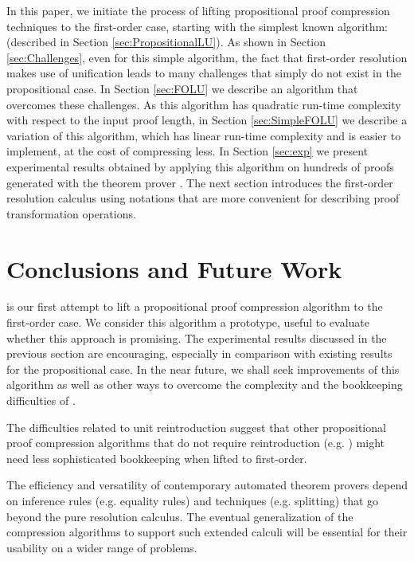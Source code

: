 \documentclass{llncs}
\begin{document}
In this paper, we initiate the process of lifting propositional proof compression techniques to the first-order case, starting with the simplest known algorithm: {\LowerUnits} (described in Section \ref{sec:PropositionalLU}). As shown in Section \ref{sec:Challenges}, even for this simple algorithm, the fact that first-order resolution makes use of unification leads to many challenges that simply do not exist in the propositional case. In Section \ref{sec:FOLU} we describe an algorithm that overcomes these challenges. As this algorithm has quadratic run-time complexity with respect to the input proof length, in Section \ref{sec:SimpleFOLU} we describe a variation of this algorithm, which has linear run-time complexity and is easier to implement, at the cost of compressing less. In Section \ref{sec:exp} we present experimental results obtained by applying this algorithm on hundreds of proofs generated with the {\SPASS} theorem prover \cite{SPASS}. The next section introduces the first-order resolution calculus using notations that are more convenient for describing proof transformation operations.















\section{Conclusions and Future Work}

{\SFOLowerUnits} is our first attempt to lift a propositional proof compression algorithm to the first-order case. We consider this algorithm a prototype, useful to evaluate whether this approach is promising. The experimental results discussed in the previous section are encouraging, especially in comparison with existing results for the propositional case. In the near future, we shall seek improvements of this algorithm as well as other ways to overcome the complexity and the bookkeeping difficulties of {\FOLowerUnits}.

The difficulties related to unit reintroduction suggest that other propositional proof compression algorithms that do not require reintroduction (e.g. {\RecyclePivotsIntersection} \cite{RPILU}) might need less sophisticated bookkeeping when lifted to first-order.

The efficiency and versatility of contemporary automated theorem provers depend on inference rules (e.g. equality rules) and techniques (e.g. splitting) that go beyond the pure resolution calculus. The eventual generalization of the compression algorithms to support such extended calculi will be essential for their usability on a wider range of problems.



\begin{footnotesize}
%


\end{footnotesize}
\end{document}
